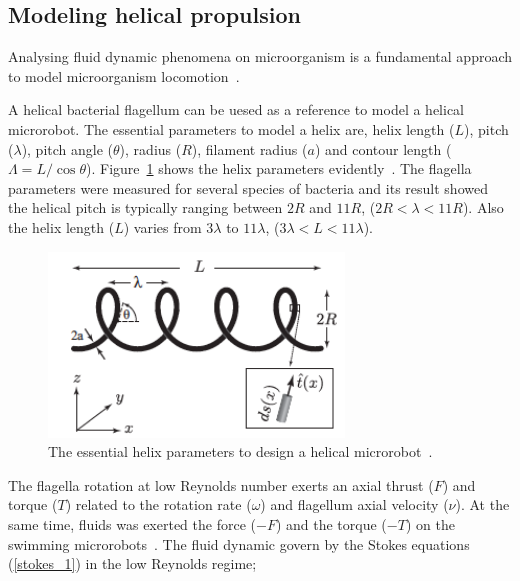 \documentclass[12pt,a4paper,titlepage]{report}
\begin{document}


\subsection{Modeling helical propulsion}\label{maths}

Analysing fluid dynamic phenomena on microorganism is a fundamental approach to model
 microorganism
 locomotion~\citep{smith2009boundary}.



A helical bacterial flagellum can be uesed as a reference to model a helical microrobot. The 
essential parameters to model a helix are, helix length ($L$), pitch ($\lambda$), pitch angle ($\theta$), 
radius ($R$), filament radius ($a$) and contour length ($\Lambda = L/ \cos \theta$). Figure~\ref{parameters} shows
the helix parameters evidently~\citep{rodenborn2013propulsion}. The flagella parameters were measured for
 several species of bacteria and its result showed the helical pitch is typically ranging between $2R$ and
$11R$, ($2R < \lambda < 11R$). Also the helix length ($L$) varies from $3\lambda$ to $11\lambda$, 
($3\lambda < L < 11\lambda$).



\begin{figure}
  \centering
    \includegraphics[width=0.7\textwidth]{parameters}
  \caption{The essential helix parameters to design a helical microrobot~\citep{rodenborn2013propulsion}.}
  \label{parameters}
\end{figure}



The flagella rotation at low Reynolds number exerts an axial thrust ($F$) and torque ($T$) related to the
rotation rate ($\omega$) and flagellum axial velocity ($\nu$). At the same time, fluids was exerted the force
 ($-F$) and the torque ($-T$) on the swimming microrobots~\citep{purcell1997efficiency}. The fluid dynamic 
govern by the Stokes equations (\ref{stokes_1}) in the low Reynolds regime;
\end{document}
